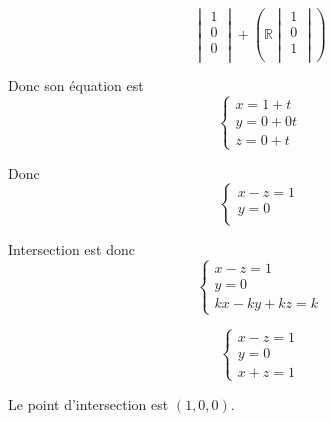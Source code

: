 \documentclass[]{book}
\theoremstyle{definition}
\newcommand{\bb}[1]{\mathbb{#1}}
\newcommand{\R}{\bb{R}}
\begin{document}
$$
\begin{vmatrix}
    1 \\
    0 \\
    0 \\
\end{vmatrix}
+(\R
    \begin{vmatrix}
        1 \\
        0 \\
        1 \\
    \end{vmatrix}
)
$$

Donc son \'equation est 
$$
\left\{ 
    \begin{array}{l}
        x = 1 + t\\
        y = 0 + 0t\\
        z = 0 + t
    \end{array}
\right.
$$

Donc
$$
\left\{ 
    \begin{array}{l}
        x - z = 1 \\
        y = 0 \\
    \end{array}
\right.
$$

Intersection est donc
$$
\left\{ 
    \begin{array}{l}
        x - z = 1 \\
        y = 0 \\
        kx - ky + kz = k
    \end{array}
\right.
$$

$$
\left\{ 
    \begin{array}{l}
        x - z = 1 \\
        y = 0 \\
        x  + z = 1
    \end{array}
\right.
$$

Le point d'intersection est $(1,0,0)$.
\end{document}
